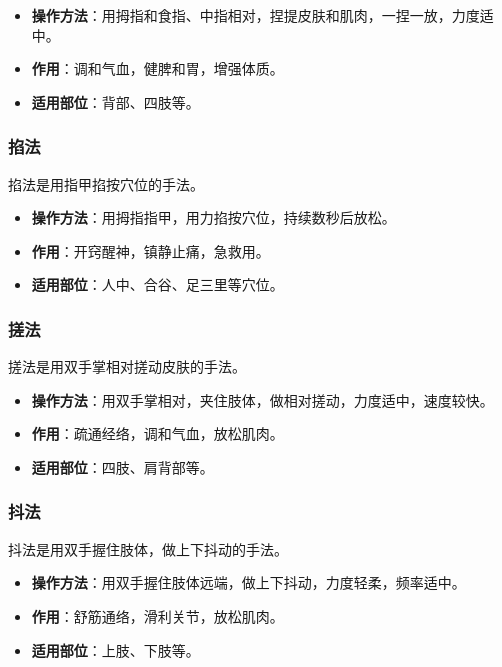 \documentclass[12pt,UTF8]{ctexbook}
\begin{document}
\begin{itemize}
\item \textbf{操作方法}：用拇指和食指、中指相对，捏提皮肤和肌肉，一捏一放，力度适中。
\item \textbf{作用}：调和气血，健脾和胃，增强体质。
\item \textbf{适用部位}：背部、四肢等。
\end{itemize}

\subsubsection{掐法}

掐法是用指甲掐按穴位的手法。

\begin{itemize}
\item \textbf{操作方法}：用拇指指甲，用力掐按穴位，持续数秒后放松。
\item \textbf{作用}：开窍醒神，镇静止痛，急救用。
\item \textbf{适用部位}：人中、合谷、足三里等穴位。
\end{itemize}

\subsubsection{搓法}

搓法是用双手掌相对搓动皮肤的手法。

\begin{itemize}
\item \textbf{操作方法}：用双手掌相对，夹住肢体，做相对搓动，力度适中，速度较快。
\item \textbf{作用}：疏通经络，调和气血，放松肌肉。
\item \textbf{适用部位}：四肢、肩背部等。
\end{itemize}

\subsubsection{抖法}

抖法是用双手握住肢体，做上下抖动的手法。

\begin{itemize}
\item \textbf{操作方法}：用双手握住肢体远端，做上下抖动，力度轻柔，频率适中。
\item \textbf{作用}：舒筋通络，滑利关节，放松肌肉。
\item \textbf{适用部位}：上肢、下肢等。
\end{itemize}
\end{document}
